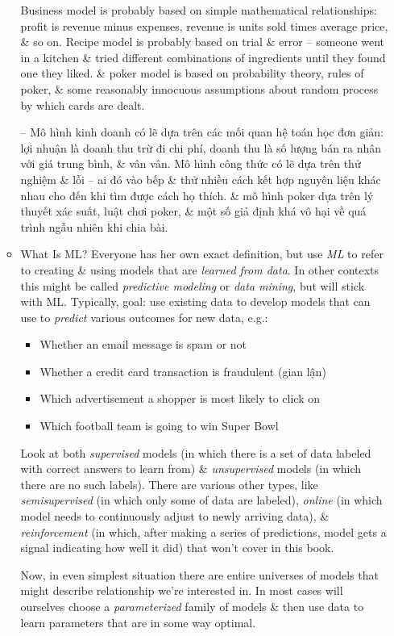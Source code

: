 \documentclass{article}
\begin{document}
\begin{itemize}
\begin{itemize}
		Business model is probably based on simple mathematical relationships: profit is revenue minus expenses, revenue is units sold times average price, \& so on. Recipe model is probably based on trial \& error -- someone went in a kitchen \& tried different combinations of ingredients until they found one they liked. \& poker model is based on probability theory, rules of poker, \& some reasonably innocuous assumptions about random process by which cards are dealt.
		
		-- Mô hình kinh doanh có lẽ dựa trên các mối quan hệ toán học đơn giản: lợi nhuận là doanh thu trừ đi chi phí, doanh thu là số lượng bán ra nhân với giá trung bình, \& vân vân. Mô hình công thức có lẽ dựa trên thử nghiệm \& lỗi -- ai đó vào bếp \& thử nhiều cách kết hợp nguyên liệu khác nhau cho đến khi tìm được cách họ thích. \& mô hình poker dựa trên lý thuyết xác suất, luật chơi poker, \& một số giả định khá vô hại về quá trình ngẫu nhiên khi chia bài.
		\item {\sf What Is ML?} Everyone has her own exact definition, but use {\it ML} to refer to creating \& using models that are {\it learned from data}. In other contexts this might be called {\it predictive modeling} or {\it data mining}, but will stick with ML. Typically, goal: use existing data to develop models that can use to {\it predict} various outcomes for new data, e.g.:
		\begin{itemize}
			\item Whether an email message is spam or not
			\item Whether a credit card transaction is fraudulent (gian lận)
			\item Which advertisement a shopper is most likely to click on
			\item Which football team is going to win Super Bowl
		\end{itemize}
		Look at both {\it supervised} models (in which there is a set of data labeled with correct answers to learn from) \& {\it unsupervised} models (in which there are no such labels). There are various other types, like {\it semisupervised} (in which only some of data are labeled), {\it online} (in which model needs to continuously adjust to newly arriving data), \& {\it reinforcement} (in which, after making a series of predictions, model gets a signal indicating how well it did) that won't cover in this book.
		
		Now, in even simplest situation there are entire universes of models that might describe relationship we're interested in. In most cases will ourselves choose a {\it parameterized} family of models \& then use data to learn parameters that are in some way optimal.
		

\end{itemize}
\end{itemize}
\end{document}
